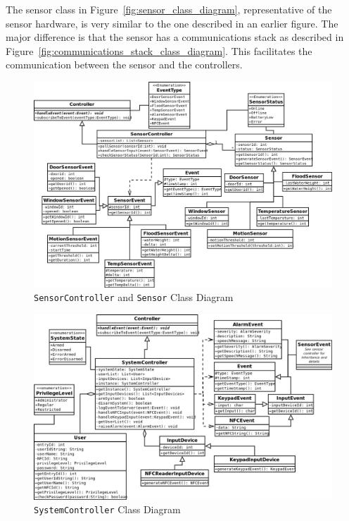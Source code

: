 \documentclass{report}
\begin{document}
The sensor class in Figure~\ref{fig:sensor_class_diagram}, representative of
the sensor hardware, is very similar to the one described in an earlier figure.
The major difference is that the sensor has a communications stack as described
in Figure~\ref{fig:communications_stack_class_diagram}. This facilitates the
communication between the sensor and the controllers.
\begin{landscape} 
\begin{figure}[hp]
    \caption{\texttt{SensorController} and \texttt{Sensor} Class Diagram}
    \label{fig:sensor_controller_class_diagram}
    \vspace{10pt}
    \includegraphics[scale=0.5]{sensor_controller_class_diagram.png}
\end{figure}
\end{landscape} 

\begin{landscape} 
\begin{figure}[hp]
    \caption{\texttt{SystemController} Class Diagram}
    \label{fig:system_controller_class_diagram}
    \vspace{30pt}
    \includegraphics[scale=0.5]{system_controller_class_diagram.png}
\end{figure}
\end{landscape} 
\end{document}
